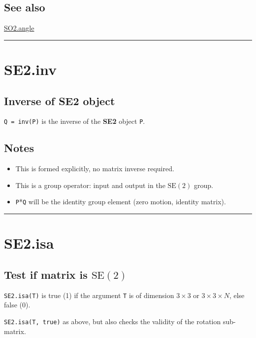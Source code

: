 \subsection*{See also}


\hyperlink{SO2.angle}{\color{blue} SO2.angle}

\vspace{1.5ex}\hrule

\hypertarget{SE2.inv}{\section*{SE2.inv}}
\subsection*{Inverse of SE2 object}


\texttt{Q = inv(P)} is the inverse of the \textbf{\color{red} SE2} object \texttt{P}.


\subsection*{Notes}
\begin{itemize}
  \item This is formed explicitly, no matrix inverse required.
  \item This is a group operator: input and output in the $\mbox{SE}(2)$ group.
  \item \texttt{P}*\texttt{Q} will be the identity group element (zero motion, identity matrix).
\end{itemize}
\vspace{1.5ex}\hrule

\hypertarget{SE2.isa}{\section*{SE2.isa}}
\subsection*{Test if matrix is $\mbox{SE}(2)$}


\texttt{SE2.isa(T)} is true (1) if the argument \texttt{T} is of dimension $3 \times 3$ or $3 \times 3 \times N$, else
false (0).



\texttt{SE2.isa(T, true)} as above, but also checks the validity of the rotation
sub-matrix.


